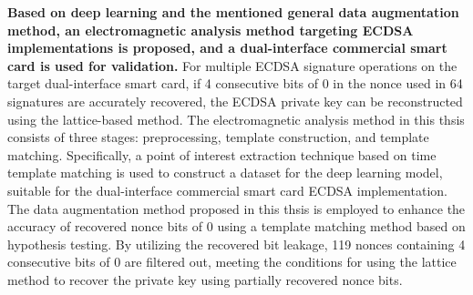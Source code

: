 \textbf{Based on deep learning and the mentioned general data augmentation method, an electromagnetic analysis method targeting ECDSA implementations is proposed, and a dual-interface commercial smart card is used for validation.} 
For multiple ECDSA signature operations on the target dual-interface smart card, if 4 consecutive bits of 0 in the nonce used in 64 signatures are accurately recovered, the ECDSA private key can be reconstructed using the lattice-based method. The electromagnetic analysis method in this thsis consists of three stages: preprocessing, template construction, and template matching. Specifically, a point of interest extraction technique based on time template matching is used to construct a dataset for the deep learning model, suitable for the dual-interface commercial smart card ECDSA implementation. The data augmentation method proposed in this thsis is employed to enhance the accuracy of recovered nonce bits of 0 using a template matching method based on hypothesis testing. By utilizing the recovered bit leakage, 119 nonces containing 4 consecutive bits of 0 are filtered out, meeting the conditions for using the lattice method to recover the private key using partially recovered nonce bits.
